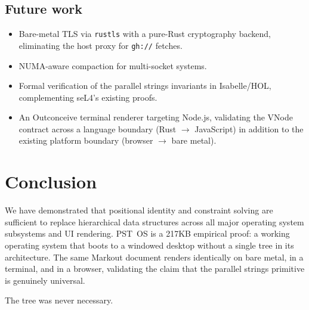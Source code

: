\documentclass[11pt,a4paper]{article}
\begin{document}
\subsection{Future work}

\begin{itemize}
  \item Bare-metal TLS via \texttt{rustls} with a pure-Rust cryptography backend, eliminating the host proxy for \texttt{gh://} fetches.
  \item NUMA-aware compaction for multi-socket systems.
  \item Formal verification of the parallel strings invariants in Isabelle/HOL, complementing seL4's existing proofs.
  \item An Outconceive terminal renderer targeting Node.js, validating the VNode contract across a language boundary (Rust $\rightarrow$ JavaScript) in addition to the existing platform boundary (browser $\rightarrow$ bare metal).
\end{itemize}

\section{Conclusion}

We have demonstrated that positional identity and constraint solving are sufficient to replace hierarchical data structures across all major operating system subsystems and UI rendering. PST~OS is a 217KB empirical proof: a working operating system that boots to a windowed desktop without a single tree in its architecture. The same Markout document renders identically on bare metal, in a terminal, and in a browser, validating the claim that the parallel strings primitive is genuinely universal.

The tree was never necessary.



\end{document}
